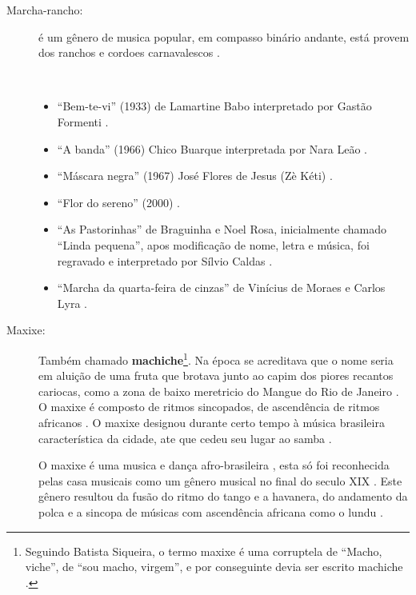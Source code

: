 \begin{description}
\item[Marcha-rancho:] 
é um gênero de musica popular, em compasso binário andante, 
está provem dos ranchos e cordoes carnavalescos \cite[pp. 65]{reinato2010musica}.

\begin{example} ~

\begin{itemize}
\item ``Bem-te-vi'' (1933) de Lamartine Babo interpretado por Gastão Formenti \cite[pp. 87]{diniz2008almanaque}.
\item ``A banda'' (1966) Chico Buarque interpretada por Nara Leão \cite[pp. 90]{diniz2008almanaque}.
\item ``Máscara negra'' (1967) José Flores de Jesus (Zè Kéti)  \cite[pp. 89]{diniz2008almanaque}.
\item ``Flor do sereno'' (2000)  \cite[pp. 88]{diniz2008almanaque}.
\item ``As Pastorinhas'' de Braguinha e Noel Rosa, inicialmente chamado ``Linda pequena'',
apos modificação de nome, letra e música, foi regravado e interpretado por Sílvio Caldas \cite[pp. 87]{diniz2008almanaque}.
\item ``Marcha da quarta-feira de cinzas'' de Vinícius de Moraes e Carlos Lyra  \cite[pp. 91]{diniz2008almanaque}.
\end{itemize}
\end{example}

\item[Maxixe:] 
Também chamado \textbf{machiche}\footnote{Seguindo Batista Siqueira, 
o termo maxixe é uma corruptela de ``Macho, viche'', 
de ``sou macho, virgem'', e por conseguinte devia ser escrito machiche \cite[pp. 198]{dourado2004dicionario}.}.
Na época se acreditava que o nome seria em aluição de uma fruta que brotava junto ao capim dos piores recantos cariocas,
como a zona de baixo meretricio do Mangue do Rio de Janeiro \cite[pp. 198]{dourado2004dicionario}.
O maxixe é composto de ritmos sincopados, de ascendência de ritmos africanos \cite[pp. 198]{dourado2004dicionario}.
O maxixe designou durante certo tempo à música brasileira característica da cidade, 
ate que cedeu seu lugar ao samba \cite[pp. 4]{musicasambavariasdef1}.

O maxixe é uma musica e dança afro-brasileira \cite[pp. 4]{musicasambavariasdef1},
esta só foi reconhecida pelas casa musicais como um gênero musical no final do seculo XIX \cite[pp. 465]{marcondes1977enciclopedia}. 
Este gênero resultou da fusão do ritmo do tango e a havanera, 
do andamento da polca e a sincopa de músicas com ascendência africana como o lundu  \cite[pp. 29]{efege1974maxixe}  \cite[pp. 465]{marcondes1977enciclopedia}. 


\end{description}
